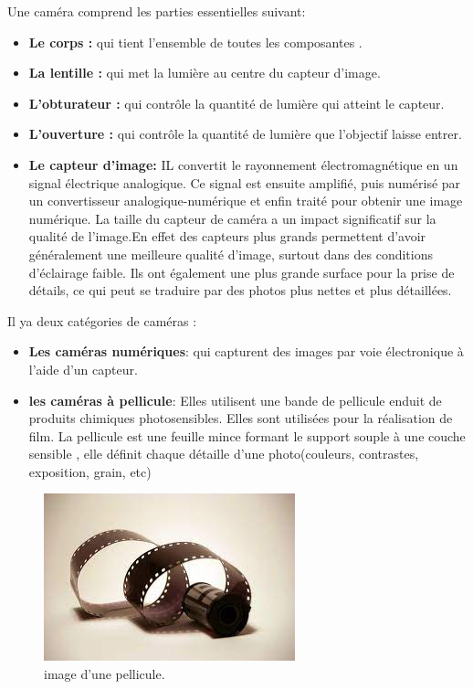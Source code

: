 Une caméra comprend les parties essentielles suivant: \\
\begin{itemize}
	\item \textbf{Le corps :} qui tient l'ensemble de toutes les composantes . \\
	
	\item \textbf{La lentille :} qui met la lumière au centre du capteur d’image. \\
	
	\item \textbf{L’obturateur :} qui contrôle la quantité de lumière qui atteint le capteur.\\ 
	
	\item \textbf{L’ouverture :} qui contrôle la quantité de lumière que l’objectif laisse entrer.\\
	
	\item \textbf{Le capteur d'image:} IL convertit le rayonnement électromagnétique en un signal électrique analogique. Ce signal est ensuite amplifié, puis numérisé par un convertisseur analogique-numérique et enfin traité pour obtenir une image numérique. La taille du capteur de caméra a un impact significatif sur la qualité de l’image.En effet des capteurs plus grands permettent d'avoir généralement une meilleure qualité d’image, surtout dans des conditions d’éclairage faible. Ils ont également une plus grande surface pour la prise de détails, ce qui peut se traduire par des photos plus nettes et plus détaillées.\\
\end{itemize}


 Il ya deux catégories de caméras :
 \begin{itemize}
 	\item \textbf{Les caméras numériques}: qui capturent des images par voie électronique à l’aide d’un capteur.
 	\item\textbf{les caméras à pellicule}: Elles utilisent une bande de pellicule enduit de produits chimiques photosensibles. Elles sont utilisées pour la réalisation de film.
 	La pellicule est une feuille mince formant le support souple à une couche sensible , elle définit chaque détaille d'une photo(couleurs, contrastes, exposition, grain, etc)\\
 \end{itemize}
 \vspace{5 cm}
\begin{figure}[h]
	\centering
	\includegraphics[scale=0.80]{image/pellicule.jpeg}
	\decoRule
	\caption[Pellicule]{image d'une pellicule.}
	\label{fig:Pellicule}
\end{figure}

